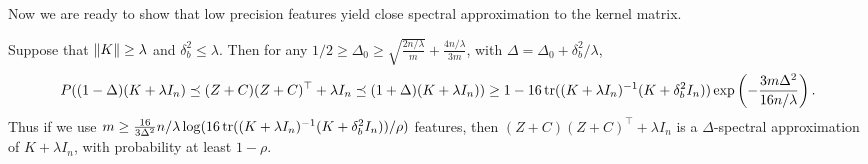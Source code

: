 Now we are ready to show that low precision features yield close spectral
approximation to the kernel matrix.

\begin{theorem}

  Suppose that $\|K\| \geq \lambda$ and $\delta^2_b \leq \lambda$.
  Then for any $1/2 \geq \Delta_0 \geq \sqrt{\frac{2n/\lambda}{m}} + \frac{4n/\lambda}{3m}$, with $\Delta =
  \Delta_0 + \delta^2_b / \lambda$,
  \begin{equation*}
    P((1 - \Delta)(K + \lambda I_n) \preceq (Z + C) (Z + C)^\top + \lambda I_n \preceq (1 + \Delta)(K + \lambda I_n)) \geq 1 - 16 \mathop{\rm tr}((K +
    \lambda I_n)^{-1} (K + \delta^2_b I_n)) \exp \left( -\frac{3m \Delta^2}{16n/\lambda} \right).
  \end{equation*}
  Thus if we use $m \geq \frac{16}{3 \Delta^2} n/\lambda \log (16 \mathop{\rm tr}((K + \lambda I_n)^{-1} (K +
  \delta^2_b I_n)) / \rho)$
  features, then $(Z + C) (Z + C)^\top + \lambda I_n$ is a $\Delta$-spectral approximation of $K + \lambda I_n$,
  with probability at least $1 - \rho$.
\end{theorem}

